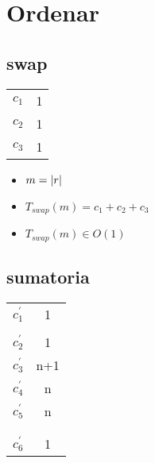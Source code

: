 \documentclass{article}
\begin{document}
    \section*{Ordenar}

    \subsection*{swap}

    \begin{minipage}{0.70\textwidth}
        
    \end{minipage}
    \hfill
    \begin{minipage}{0.25\textwidth}
        \begin{tabular}{|c|c}
            $c_1$ & 1 \\
            $c_2$ & 1 \\
            $c_3$ & 1 \\
        \end{tabular}
    \end{minipage}

    \begin{itemize}
        \item $m = |r|$
        \item $T_{swap}(m) = c_1 + c_2 + c_3 $
        \item $T_{swap}(m) \in O(1)$
    \end{itemize}

    \subsection*{sumatoria}

    \begin{minipage}{0.70\textwidth}
        
    \end{minipage}
    \hfill
    \begin{minipage}{0.25\textwidth}
        \begin{tabular}{|c|c}
            $c^{\prime}_1$ & 1   \\
                           &     \\
            $c^{\prime}_2$ & 1   \\
            $c^{\prime}_3$ & n+1 \\
            $c^{\prime}_4$ & n   \\
            $c^{\prime}_5$ & n   \\
                           &     \\
                           &     \\
            $c^{\prime}_6$ & 1   \\
        \end{tabular}
    \end{minipage}
\end{document}
